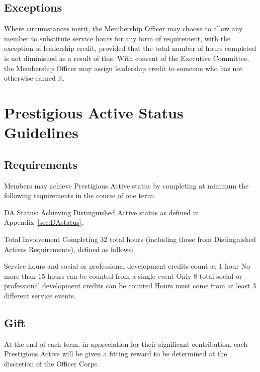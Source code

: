 \section{Exceptions} Where circumstances merit, the Membership Officer may choose to allow any member to substitute service hours for any form of requirement, with the exception of leadership credit, provided that the total number of hours completed is not diminished as a result of this. With consent of the Executive Committee, the Membership Officer may assign leadership credit to someone who has not otherwise earned it.

\chapter{Prestigious Active Status Guidelines}\label{sec:PAstatus}
\section{Requirements} Members may achieve Prestigious Active status by completing at minimum the following requirements in the course of one term:
\begin{enumsubsection}
\item{DA Status:} Achieving Distinguished Active status as defined in Appendix~\ref{sec:DAstatus}.
\item{Total Involvement} Completing 32 total hours (including those from Distinguished Actives Requirements), defined as follows:
\begin{compactenum}[1.]
\itemnotoc Service hours and social or professional development credits count as 1 hour
\itemnotoc No more than 15 hours can be counted from a single event
\itemnotoc Only 8 total social or professional development credits  can be counted
\itemnotoc Hours must come from at least 3 different service events.
\end{compactenum}
\end{enumsubsection}
\section{Gift} At the end of each term, in appreciation for their significant contribution, each Prestigious Active will be given a fitting reward to be determined at the discretion of the Officer Corps. %

